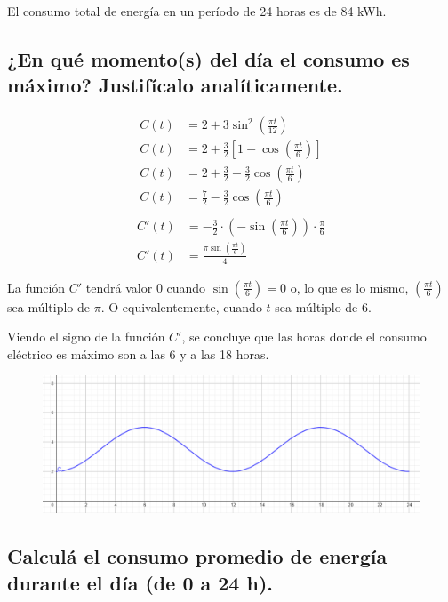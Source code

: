 \documentclass[11pt, a4paper]{article}
\begin{document}
El consumo total de energía en un período de 24 horas es de 84 kWh.

\subsection{¿En qué momento(s) del día el consumo es máximo? Justifícalo analíticamente.
}

\begin{align*}
    C(t) &= 2 + 3\sin^2\left(\frac{\pi t}{12}\right) \\
    C(t) &= 2 + \frac{3}{2}\left[1 - \cos\left(\frac{\pi t}{6}\right)\right] \\
    C(t) &= 2 + \frac{3}{2} - \frac{3}{2}\cos\left(\frac{\pi t}{6}\right) \\
    C(t) &= \frac{7}{2} - \frac{3}{2}\cos\left(\frac{\pi t}{6}\right) \\
\end{align*}
\begin{align*}
    C'(t) &= -\frac{3}{2} \cdot \left(-\sin\left(\frac{\pi t}{6}\right)\right) \cdot \frac{\pi}{6} \\
    C'(t) &= \frac{\pi \sin\left(\frac{\pi t}{6}\right)}{4}
\end{align*}

La función $C'$ tendrá valor 0 cuando $\sin(\frac{\pi t}{6}) = 0$ o, lo que es lo mismo, $(\frac{\pi t}{6})$ sea múltiplo de $\pi$. O equivalentemente, cuando $t$ sea múltiplo de 6.

Viendo el signo de la función $C'$, se concluye que las horas donde el consumo eléctrico es máximo son a las 6 y a las 18 horas.

\begin{figure}[h]
	\centering
	\includegraphics[width=0.9\linewidth]{image.png}
\end{figure}

\subsection{Calculá el consumo promedio de energía durante el día (de 0 a 24 h).}
\end{document}
